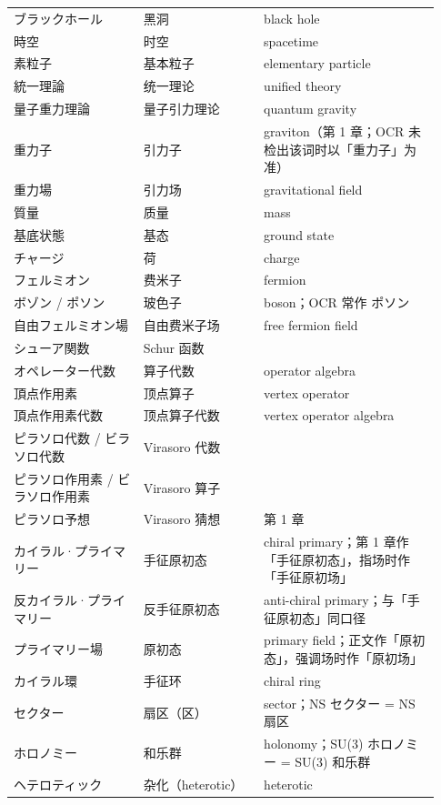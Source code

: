 \begin{longtable}{@{}>{\raggedright\arraybackslash}p{0.29\linewidth}>{\raggedright\arraybackslash}p{0.26\linewidth}>{\raggedright\arraybackslash}p{0.38\linewidth}@{}}
ブラックホール & \mbox{黑洞} & black hole \\
時空 & \mbox{时空} & spacetime \\
素粒子 & \mbox{基本粒子} & elementary particle \\
統一理論 & \mbox{统一理论} & unified theory \\
量子重力理論 & \mbox{量子引力理论} & quantum gravity \\
重力子 & \mbox{引力子} & graviton（第 1 章；OCR 未检出该词时以「重力子」为准） \\
重力場 & \mbox{引力场} & gravitational field \\
質量 & \mbox{质量} & mass \\
基底状態 & \mbox{基态} & ground state \\
チャージ & \mbox{荷} & charge \\
フェルミオン & \mbox{费米子} & fermion \\
ボゾン / ポソン & \mbox{玻色子} & boson；OCR 常作 ポソン \\
自由フェルミオン場 & \mbox{自由费米子场} & free fermion field \\
シューア関数 & Schur \mbox{函数} &  \\
オペレーター代数 & \mbox{算子代数} & operator algebra \\
頂点作用素 & \mbox{顶点算子} & vertex operator \\
頂点作用素代数 & \mbox{顶点算子代数} & vertex operator algebra \\
ピラソロ代数 / ビラソロ代数 & Virasoro \mbox{代数} &  \\
ピラソロ作用素 / ビラソロ作用素 & Virasoro \mbox{算子} &  \\
ピラソロ予想 & Virasoro \mbox{猜想} & 第 1 章 \\
カイラル·プライマリー & \mbox{手征原初态} & chiral primary；第 1 章作「手征原初态」，指场时作「手征原初场」 \\
反カイラル·プライマリー & \mbox{反手征原初态} & anti-chiral primary；与「手征原初态」同口径 \\
プライマリー場 & \mbox{原初态} & primary field；正文作「原初态」，强调场时作「原初场」 \\
カイラル環 & \mbox{手征环} & chiral ring \\
セクター & \mbox{扇区（区）} & sector；NS セクター = NS 扇区 \\
ホロノミー & \mbox{和乐群} & holonomy；SU(3) ホロノミー = SU(3) 和乐群 \\
ヘテロティック & \mbox{杂化（heterotic）} & heterotic \\

\end{longtable}
